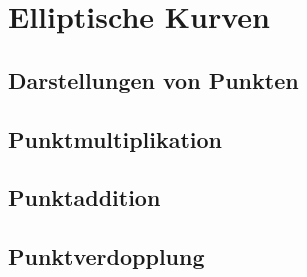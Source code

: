 \chapter{Elliptische Kurven}



\section{Darstellungen von Punkten}

\section{Punktmultiplikation}



\section{Punktaddition}


\section{Punktverdopplung}